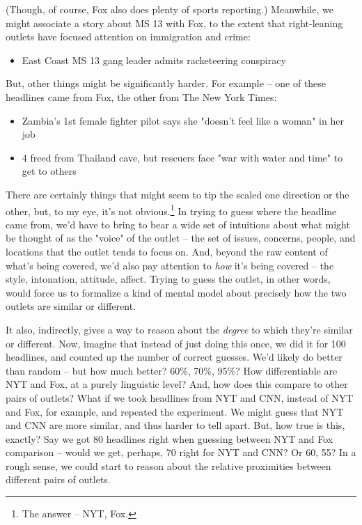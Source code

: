 \documentclass{scrartcl}
\begin{document}
(Though, of course, Fox also does plenty of sports reporting.) Meanwhile, we might associate a story about MS 13 with Fox, to the extent that right-leaning outlets have focused attention on immigration and crime:

\begin{itemize}
  \item East Coast MS 13 gang leader admits racketeering conspiracy
\end{itemize}

But, other things might be significantly harder. For example -- one of these headlines came from Fox, the other from The New York Times:

\begin{itemize}
  \item Zambia's 1st female fighter pilot says she "doesn't feel like a woman" in her job
  \item 4 freed from Thailand cave, but rescuers face "war with water and time" to get to others
\end{itemize}

There are certainly things that might seem to tip the scaled one direction or the other, but, to my eye, it's not obvious.\footnote{The answer -- NYT, Fox.} In trying to guess where the headline came from, we'd have to bring to bear a wide set of intuitions about what might be thought of as the "voice" of the outlet -- the set of issues, concerns, people, and locations that the outlet tends to focus on. And, beyond the raw content of what's being covered, we'd also pay attention to \textit{how} it's being covered -- the style, intonation, attitude, affect. Trying to guess the outlet, in other words, would force us to formalize a kind of mental model about precisely how the two outlets are similar or different.

It also, indirectly, gives a way to reason about the \textit{degree} to which they're similar or different. Now, imagine that instead of just doing this once, we did it for 100 headlines, and counted up the number of correct guesses. We'd likely do better than random -- but how much better? 60\%, 70\%, 95\%? How differentiable are NYT and Fox, at a purely linguistic level? And, how does this compare to other pairs of outlets? What if we took headlines from NYT and CNN, instead of NYT and Fox, for example, and repeated the experiment. We might guess that NYT and CNN are more similar, and thus harder to tell apart. But, how true is this, exactly? Say we got 80 headlines right when guessing between NYT and Fox comparison -- would we get, perhaps, 70 right for NYT and CNN? Or 60, 55? In a rough sense, we could start to reason about the relative proximities between different pairs of outlets.
\end{document}
